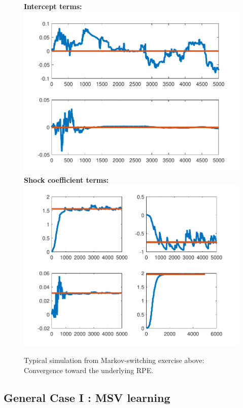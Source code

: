 \documentclass[12pt,reqno]{article}
\numberwithin{equation}{section}
\begin{document}
\begin{figure}[H]
\caption{Typical simulation from Markov-switching exercise above: Convergence toward the underlying RPE.} 
\textbf{Intercept terms:} \\
\includegraphics[scale=0.4]{MS_simulation_alphas.pdf}\\
\textbf{Shock coefficient terms: } \\
\includegraphics[scale=0.4]{MS_simulation_shockCoef.pdf}\\
\end{figure}

\subsection*{General Case I : MSV learning} 
\end{document}
